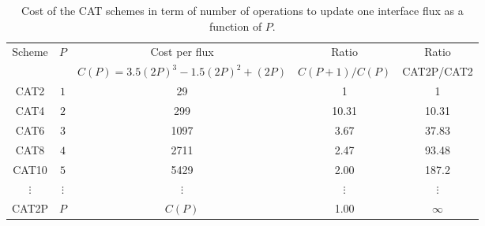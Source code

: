  
\begin{table}[!ht]
    \centering
    \numerikNine
    \begin{tabular}{|cc||c|c|c|}
    \hline
    Scheme & $P$ & Cost per flux & Ratio & Ratio \\
    & & {\footnotesize $C(P)=3.5(2P)^3 - 1.5(2P)^2 + (2P)$} & {\footnotesize$C(P+1)/C(P)$} & {\footnotesize CAT2P/CAT2} \\
    \hline
    CAT2 & $1$ & 29   & 1 & 1 \\
    CAT4 & $2$ & 299  & 10.31 & 10.31\\
    CAT6 & $3$ & 1097 &  3.67 & 37.83 \\
    CAT8 & $4$ & 2711 &  2.47 & 93.48 \\
    CAT10 &$5$ & 5429 &  2.00 &187.2 \\
    $\vdots$ & $\vdots$ & $\vdots$ & $\vdots$ & $\vdots$ \\
    CAT2P & $P$ & $C(P)$ & 1.00 & $\infty$ \\ 
    \hline
    \end{tabular}
    \caption{Cost of the CAT schemes in term of number of operations to update one interface flux as a function of $P$. }
    \label{tab:Cost}
\end{table}